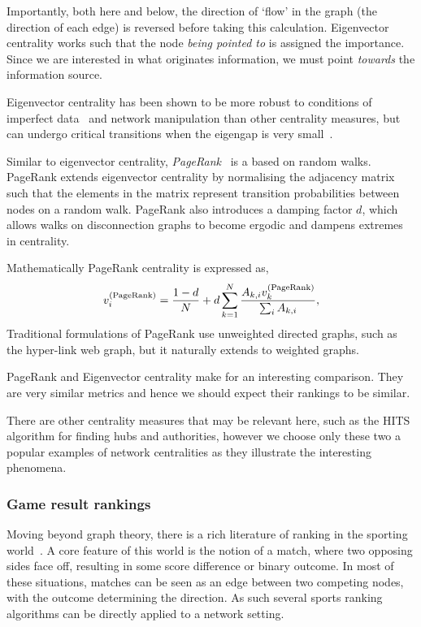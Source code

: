 Importantly, both here and below, the direction of `flow' in the graph (the direction of each edge) is reversed before taking this calculation. Eigenvector centrality works such that the node \emph{being pointed to} is assigned the importance. Since we are interested in what originates information, we must point \emph{towards} the information source.

Eigenvector centrality has been shown to be more robust to conditions of imperfect data~\cite{costenbader_stability_2003} and network manipulation \cite{niu_robustness_2015} than other centrality measures, but can undergo critical transitions when the eigengap is very small~\cite{south_centrality_2021}.

Similar to eigenvector centrality, \emph{PageRank}~\cite{brin_anatomy_1998,page_pagerank_1999} is a based on random walks. PageRank extends eigenvector centrality by normalising the adjacency matrix such that the elements in the matrix represent transition probabilities between nodes on a random walk. PageRank also introduces a damping factor $d$, which allows walks on disconnection graphs to become ergodic and dampens extremes in centrality.

Mathematically PageRank centrality is expressed as,
\begin{equation}
	v_i^{\rm (PageRank)}=\frac{1-d}{N}+d \sum_{k =1 }^{N} \frac{ A_{k,i} v_k^{\rm (PageRank)}}{\sum_i A_{k,i}},
\end{equation}
Traditional formulations of PageRank use unweighted directed graphs, such as the hyper-link web graph, but it naturally extends to weighted graphs.

PageRank and Eigenvector centrality make for an interesting comparison. They are very similar metrics and hence we should expect their rankings to be similar. 

There are other centrality measures that may be relevant here, such as the HITS algorithm for finding hubs and authorities, however we choose only these two a popular examples of network centralities as they illustrate the interesting phenomena.

\subsubsection{Game result rankings}

Moving beyond graph theory, there is a rich literature of ranking in the sporting world~\cite{langville_whos_2012}. A core feature of this world is the notion of a match, where two opposing sides face off, resulting in some score difference or binary outcome. In most of these situations, matches can be seen as an edge between two competing nodes, with the outcome determining the direction. As such several sports ranking algorithms can be directly applied to a network setting.

